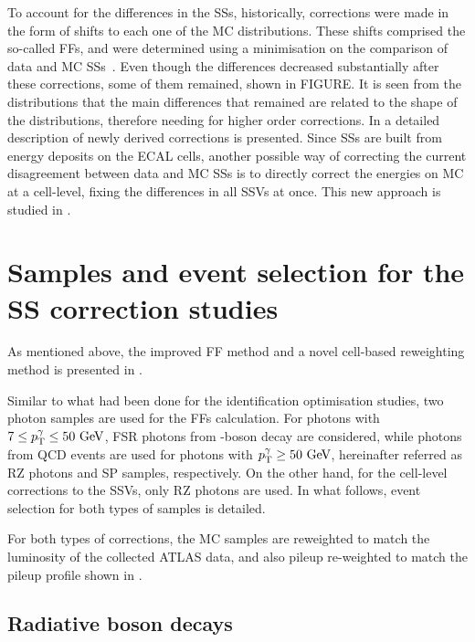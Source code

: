 To account for the differences in the \acp{SS}, historically, corrections were made in the form of shifts to each one of the \ac{MC} distributions. These shifts comprised the so-called \acp{FF}, and were determined using a \chisq minimisation on the comparison of data and \ac{MC} \acp{SS}~\cite{ATLASEGammaPerformance20152016,ATLASEGammaPerformance20152017}.
Even though the differences decreased substantially after these corrections, some of them remained, shown in FIGURE. It is seen from the distributions that the main differences that remained are related to the shape of the distributions, therefore needing for higher order corrections. In \Ch{\ref{ch:ffs}} a detailed description of newly derived corrections is presented.
Since \acp{SS} are built from energy deposits on the \ac{ECAL} cells, another possible way of correcting the current disagreement between data and \ac{MC} \acp{SS} is to directly correct the energies on \ac{MC} at a cell-level, fixing the differences in all \acp{SSV} at once. This new approach is studied in \Ch{\ref{ch:cellrw}}.


\section{Samples and event selection for the \ac{SS} correction studies}

As mentioned above, the improved \ac{FF} method and a novel cell-based reweighting method is presented in \Chs{\ref{ch:ffs}}{\ref{ch:cellrw}}.

Similar to what had been done for the identification optimisation studies, two photon samples are used for the \acp{FF} calculation. For photons with \(7\leq p_{\text{T}}^{\gamma}\leq 50~\text{GeV}\), \ac{FSR} photons from \Zboson-boson decay are considered, while photons from \ac{QCD} \gammajet events are used for photons with \(p_{\text{T}}^{\gamma}\geq50~\text{GeV}\), hereinafter referred as \ac{RZ} photons and \ac{SP} samples, respectively. On the other hand, for the cell-level corrections to the \acp{SSV}, only \ac{RZ} photons are used. In what follows, event selection for both types of samples is detailed.

For both types of corrections, the \ac{MC} samples are reweighted to match the luminosity of the collected \ac{ATLAS} data, and also pileup re-weighted to match the pileup profile shown in \Sect{\ref{sec:atlas:run2}}.

\subsection{Radiative \Zboson boson decays}

